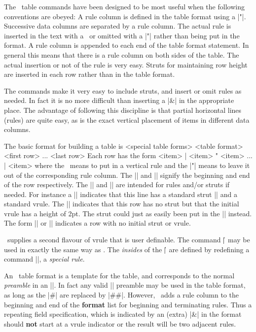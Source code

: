 The \intex\ table commands have been designed to be most useful when the following
conventions are obeyed:
\beginlist
\li {\bull} A rule column is defined in the table format
using a |"|. Successive data columns are separated by a rule column.
The actual rule is inserted in the text with a \vrt\ or omitted with a 
|"|  rather than being put in the format.
\li {\bull} A rule column is appended to each end of the table format
statement. In general this means that there is a rule column on both sides of
the table. The actual insertion or not of the rule is very easy.
\li {\bull} Struts for maintaining row height are inserted in each row rather
than in the table format.
\endlist

The commands make it very easy to include struts, and insert or omit rules as
needed. In fact it is no more difficult than inserting a |&| in the
appropriate place. The advantage of following this discipline is that partial
horizontal lines (rules) are quite easy, as is the exact vertical placement 
of items in different  data columns.

The basic format for building a table is
\begintt
\begintable
<special table forms>
\begintableformat
<table format>
\endtableformat
<first row>
    ...
<last row>
\endtable
\endtt
Each row has the form
\begintt
{}  <item> | <item> " <item> ... | <item> 
\endtt
where the \vrt\ means to put in a vertical rule and the |"| means to leave it
out of the corresponding rule column. 
The || and || signify the beginning and end of the row
respectively. The || and || are intended for rules and/or
struts if needed. For instance a |\br{\:|\vrt|}| indicates that this line has a
standard strut |\:| and a standard vrule. The ||
indicates that this row has no strut but that the initial vrule has a height
of 2pt. The strut could just as easily been put in the |\er{\:}| instead. 
The form |\br{}| or || indicates a row with no initial strut or vrule. 

\intex\ supplies a second flavour of vrule that is user definable. The
command |\|\vrt\ may be used in exactly the same way as \vrt. The {\it
insides} of the |\|\vrt\ are defined by redefining a command |\sprule|, a {\it
special rule}. 

An \intex\ table format is a template for the table, and corresponds to the
normal {\it preamble} in an |\halign|. In fact any valid |\halign| preamble
may be used in the table format, as long as the |#| are replaced by |##|.
However, \intex\ adds a rule column  to the beginning and end of the {\bf format}
list for 
beginning and terminating rules. Thus a repeating field specification, which
is indicated by an (extra) |&| in the format should
{\bf not} start at a vrule indicator or the result will be two adjacent rules.

